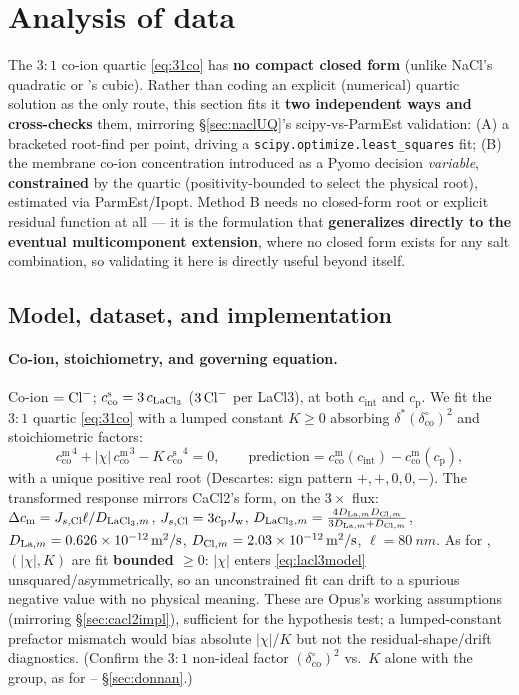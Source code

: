 \documentclass[11pt]{article}
\newcommand{\note}[1]{{\color{blue}\textsf{(#1)}}}
\newcommand{\cm}[1]{{c^{\mathrm{m}}_{#1}}}
\newcommand{\cs}[1]{{c^{\mathrm{s}}_{#1}}}
\newcommand{\co}{\mathrm{co}}
\newcommand{\Jw}{J_{\mathrm{w}}}
\newcommand{\dstar}{\delta^{*}}
\newcommand{\cint}{c_{\mathrm{int}}}
\newcommand{\cp}{c_{\mathrm{p}}}
\begin{document}
\section{Analysis of  data}\label{sec:lacl3}
The $3{:}1$ co-ion quartic \eqref{eq:31co} has \textbf{no compact closed
form} (unlike NaCl's quadratic or 's cubic). Rather than coding an
explicit (numerical) quartic solution as the only route, this section fits
it \textbf{two independent ways and cross-checks} them, mirroring
\S\ref{sec:naclUQ}'s scipy-vs-ParmEst validation: (A) a bracketed root-find
per point, driving a \texttt{scipy.optimize.least\_squares} fit; (B) the
membrane co-ion concentration introduced as a Pyomo decision \emph{variable},
\textbf{constrained} by the quartic (positivity-bounded to select the
physical root), estimated via ParmEst/Ipopt. Method B needs no closed-form
root or explicit residual function at all --- it is the formulation that
\textbf{generalizes directly to the eventual multicomponent extension}, where no
closed form exists for any salt combination, so validating it here is
directly useful beyond  itself.

\subsection{Model, dataset, and implementation}\label{sec:lacl3impl}
\paragraph{Co-ion, stoichiometry, and governing equation.} Co-ion $=\ce{Cl-}$;
$\cs{\co}=3\,c_{\ce{LaCl3}}$ ($3\,\ce{Cl-}$ per LaCl3), at both $\cint$ and
$\cp$. We fit the $3{:}1$ quartic \eqref{eq:31co} with a lumped constant
$K\ge0$ absorbing $\dstar(\delta^{\circ}_{\co})^2$ and stoichiometric factors:
\begin{equation}
  \cm{\co}^4 + |\chi|\,\cm{\co}^3 - K\,\cs{\co}^4 = 0,
  \qquad \text{prediction} = \cm{\co}(\cint) - \cm{\co}(\cp),
  \label{eq:lacl3model}
\end{equation}
with a unique positive real root (Descartes: sign pattern $+,+,0,0,-$). The
transformed response mirrors CaCl2's form, on the $3\times$  flux:
$\Delta c_{\mathrm m}=J_{s,\ce{Cl}}\ell/D_{\ce{LaCl3},m}$,
$J_{s,\ce{Cl}}=3\cp\Jw$, $D_{\ce{LaCl3},m}=\frac{4D_{\ce{La},m}D_{\ce{Cl},m}}{3D_{\ce{La},m}+D_{\ce{Cl},m}}$,
$D_{\ce{La},m}=\SI{0.626e-12}{m^2/s}$, $D_{\ce{Cl},m}=\SI{2.03e-12}{m^2/s}$,
$\ell=\SI{80}{nm}$. As for , $(|\chi|,K)$ are fit \textbf{bounded
$\ge0$}: $|\chi|$ enters \eqref{eq:lacl3model} unsquared/asymmetrically, so an
unconstrained fit can drift to a spurious negative value with no physical
meaning. These are Opus's working assumptions (mirroring \S\ref{sec:cacl2impl}),
sufficient for the hypothesis test; a lumped-constant prefactor mismatch would
bias absolute $|\chi|$/$K$ but not the residual-shape/drift diagnostics.
\note{Confirm the $3{:}1$ non-ideal factor $(\delta^{\circ}_{\co})^2$ vs.\ $K$
alone with the group, as for \ce{CaCl2} -- \S\ref{sec:donnan}.}
\end{document}

